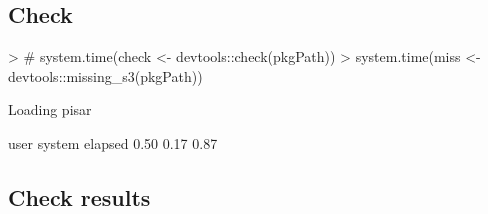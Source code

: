 \documentclass[a4paper,12pt]{article}\usepackage[]{graphicx}\usepackage[]{color}
\begin{document}
\subsection{Check}
\begin{Schunk}
\begin{Sinput}
> # system.time(check <- devtools::check(pkgPath))
> system.time(miss <- devtools::missing_s3(pkgPath))
\end{Sinput}
\begin{Soutput}
Loading pisar
\end{Soutput}
\begin{Soutput}
   user  system elapsed 
   0.50    0.17    0.87 
\end{Soutput}
\end{Schunk}
\clearpage
\subsection{Check results}
\end{document}
